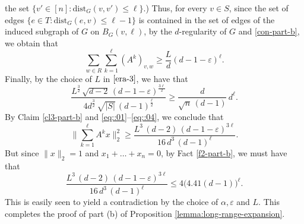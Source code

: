 \documentclass[11pt,leqno]{amsart}
\theoremstyle{remark}
\theoremstyle{plain}
\begin{document}
the set $\big\{v'\in [n]\colon \mathrm{dist}_G(v,v')\leqslant\ell\big\}$.) Thus, for every $v\in S$, since the set
of edges $\big\{e\in T\colon \mathrm{dist}_G(e,v)\leqslant\ell-1\big\}$ is contained in the set of edges of the induced
subgraph of $G$ on $B_G(v,\ell)$, by the $d$-regularity of $G$ and \eqref{con-part-b}, we obtain that
\begin{equation}\label{eq::02}
 \sum_{w\in R}\sum_{k=1}^{\ell} (A^k)_{v,w}\geqslant \frac{L}{d}(d-1-\varepsilon)^\ell.
\end{equation}
Finally, by the choice of $L$ in $\eqref{era-3}$, we have that
\begin{equation} \label{eq::04}
\frac{L^{\frac{3}{2}}\, \sqrt{d-2}\, (d-1-\varepsilon)^{\frac{3\ell}{2}}}{4 d^{\frac{3}{2}}\, \sqrt{|S|}\, (d-1)^{\frac{\ell}{2}}}
\geqslant \frac{d}{\sqrt{n}\, (d-1)}\, d^\ell.
\end{equation}
By Claim \ref{cl3-part-b} and \eqref{eq::01}--\eqref{eq::04}, we conclude that
\[ \bigg\| \sum_{k=1}^{\ell} A^k x\bigg\|_2^2 \geqslant
\frac{L^{3}\, (d-2)\, (d-1-\varepsilon)^{3\ell}}{16\, d^{3}\, (d-1)^{\ell}}. \]
But since $\|x\|_2=1$ and $x_1+\dots+x_n=0$, by Fact \ref{f2-part-b}, we must have that
\[ \frac{L^{3}\, (d-2)\, (d-1-\varepsilon)^{3\ell}}{16\, d^{3}\, (d-1)^{\ell}} \leqslant 4 \big( 4.41(d-1)\big)^\ell. \]
This is easily seen to yield a contradiction by the choice of $\alpha,\varepsilon$ and $L$. This completes
the proof of part (b) of Proposition \ref{lemma:long-range-expansion}.
\end{document}
